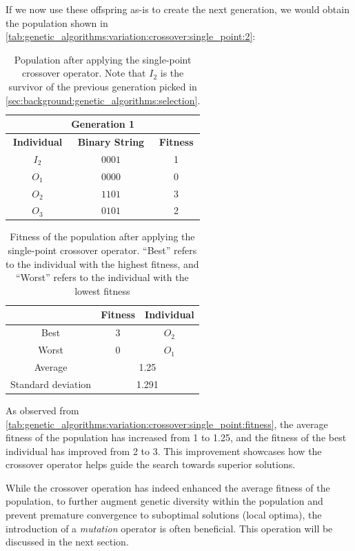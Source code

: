   If we now use these offspring as-is to create the next generation, we would obtain the
  population shown in \vref{tab:genetic_algorithms:variation:crossover:single_point:2}:

  \begin{table}[ht!]
    \centering
    \begin{tabular}{c | c | c }
      \multicolumn{3}{c}{\textbf{Generation 1}} \\
      \hline
      \hline
      \textbf{Individual} & \textbf{Binary String}  & \textbf{Fitness} \\
      \hline
      \(I_2\)             & \(0001\)                & 1 \\
      \(O_1\)             & \(0000\)                & 0 \\
      \(O_2\)             & \(1101\)                & 3 \\
      \(O_3\)             & \(0101\)                & 2
    \end{tabular}
    \caption{
      Population after applying the single-point crossover operator.
      Note that \(I_2\) is the survivor of the previous generation picked in 
      \vref{sec:background:genetic_algorithms:selection}.
    }
    \label{tab:genetic_algorithms:variation:crossover:single_point:2}
  \end{table}

  \begin{table}[H]
    \centering
    \begin{tabular}{|c|c|c|}
      \hline
            & \textbf{Fitness} & \textbf{Individual}  \\
      \hline
      Best  & 3 & \(O_2\) \\
      Worst & 0 & \(O_1\) \\
      \hline
      \hline
      Average & \multicolumn{2}{c|}{1.25} \\
      \hline
      Standard deviation & \multicolumn{2}{c|}{1.291} \\
      \hline
    \end{tabular}
    \caption{
      Fitness of the population after applying the single-point crossover operator.
      \enquote{Best} refers to the individual with the highest fitness, and \enquote{Worst} refers 
      to the individual with the lowest fitness
    }
    \label{tab:genetic_algorithms:variation:crossover:single_point:fitness}
  \end{table}

  As observed from \vref{tab:genetic_algorithms:variation:crossover:single_point:fitness}, the 
  average fitness of the population has increased from 1 to 1.25, and the fitness of the best 
  individual has improved from 2 to 3. 
  This improvement showcases how the crossover operator helps guide the search towards superior 
  solutions.

  While the crossover operation has indeed enhanced the average fitness of the population, to 
  further augment genetic diversity within the population and prevent premature convergence to 
  suboptimal solutions (local optima), the introduction of a \emph{mutation} operator is often 
  beneficial. 
  This operation will be discussed in the next section.
